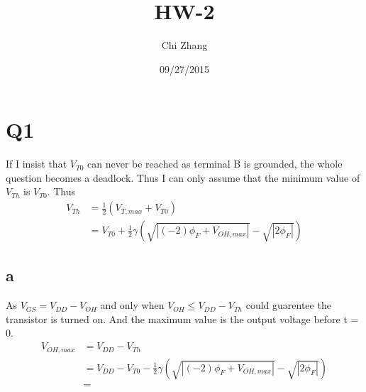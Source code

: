 \documentclass[a4paper,10pt]{article}
\title{HW-2}
\author{Chi Zhang}
\date{09/27/2015}
\begin{document}
\maketitle
\section*{Q1}
If I insist that \begin{math}V_{T0}\end{math} can never be reached as terminal B is grounded, the whole question becomes a
deadlock. Thus I can only assume that the minimum value of \begin{math}V_{Th}\end{math} is \begin{math}V_{T0}\end{math}.
Thus
\begin{equation}
\begin{split}
 V_{Th} &= \frac{1}{2}(V_{T, max} + V_{T0})\\
        &= V_{T0} + \frac{1}{2}\gamma(\sqrt{|(-2)\phi_F + V_{OH, max}|} - \sqrt{|2\phi_F|})
\end{split}
\end{equation}
\subsection*{a}
As \begin{math}V_{GS} = V_{DD} - V_{OH}\end{math} and only when \begin{math}V_{OH} \leq V_{DD} - V_{Th}\end{math} could 
guarentee the transistor is turned on. And the maximum value is the output voltage before t = 0.
\begin{equation}
\begin{split}
 V_{OH, max} &= V_{DD} - V_{Th}\\
        &= V_{DD} - V_{T0} - \frac{1}{2}\gamma(\sqrt{|(-2)\phi_F + V_{OH, max}|} - \sqrt{|2\phi_F|})\\
        &= 
\end{split}
\end{equation}
\end{document}
